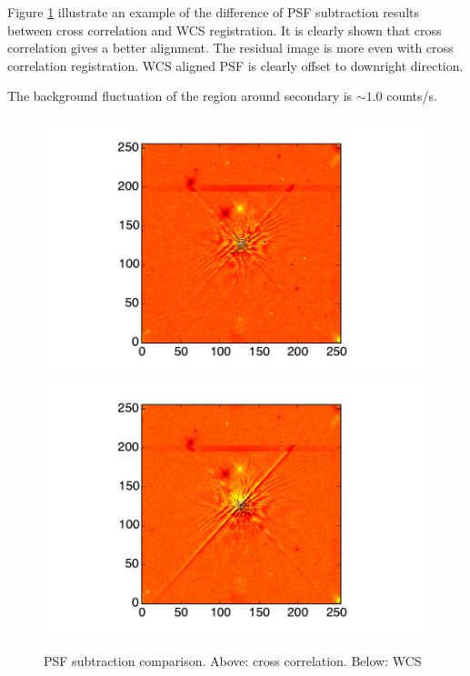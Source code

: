 \documentclass[paper=letter, fontsize=11pt]{scrartcl} %
\numberwithin{equation}{section} %
\numberwithin{figure}{section} %
\numberwithin{table}{section} %
\begin{document}
Figure \ref{fig:subcomp} illustrate an example of the difference of
PSF subtraction results between cross correlation and WCS
registration. It is clearly shown that cross correlation gives a
better alignment. The residual image is more even with cross
correlation registration. WCS aligned PSF is clearly offset to
downright direction.\par

The background fluctuation of the region around secondary is $\sim
1.0$ counts/s.\par

\begin{figure}
  \centering
  \includegraphics[width=\textwidth]{cc_example}
  \includegraphics[width=\textwidth]{wcs_example}
  \caption{PSF subtraction comparison. Above: cross
    correlation. Below: WCS}\label{fig:subcomp}
\end{figure}
\end{document}
